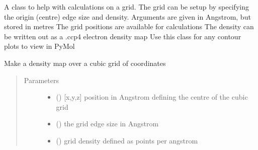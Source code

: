 \documentclass[a4paper,10pt,english,openany,oneside]{sphinxmanual}
\begin{document}
\begin{fulllineitems}
\label{\detokenize{reference/generated/paramagpy.fit.DensityMap:paramagpy.fit.DensityMap}}
\sphinxAtStartPar
A class to help with calculations on a grid.
The grid can be setup by specifying the origin (centre)
edge size and density.
Arguments are given in Angstrom, but stored in metres
The grid positions are available for calculations
The density can be written out as a .ccp4 electron density map
Use this class for any contour plots to view in PyMol

\begin{fulllineitems}
\label{\detokenize{reference/generated/paramagpy.fit.DensityMap:paramagpy.fit.DensityMap.__init__}}
\sphinxAtStartPar
Make a density map over a cubic grid of coordinates
\begin{quote}\begin{description}
\item[{Parameters}] \leavevmode\begin{itemize}
\item {} 
\sphinxAtStartPar
{} () \textendash{} {[}x,y,z{]} position in Angstrom defining the centre of the cubic grid

\item {} 
\sphinxAtStartPar
{} () \textendash{} the grid edge size in Angstrom

\item {} 
\sphinxAtStartPar
{} () \textendash{} grid density defined as points per angstrom

\end{itemize}

\end{description}\end{quote}


\end{fulllineitems}
\end{fulllineitems}
\end{document}
